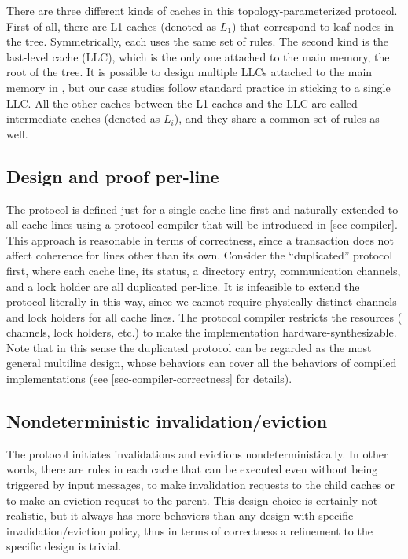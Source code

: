 There are three different kinds of caches in this topology-parameterized protocol.
First of all, there are L1 caches (denoted as $L_1$) that correspond to leaf nodes in the tree.
Symmetrically, each uses the same set of rules.
The second kind is the last-level cache (LLC), which is the only one attached to the main memory, the root of the tree.
It is possible to design multiple LLCs attached to the main memory in \hemiola{}, but our case studies follow standard practice in sticking to a single LLC.
All the other caches between the L1 caches and the LLC are called intermediate caches (denoted as $L_i$), and they share a common set of rules as well.

\subsection{Design and proof per-line}
\label{sec-design-line}

The protocol is defined just for a single cache line first and naturally extended to all cache lines using a protocol compiler that will be introduced in \autoref{sec-compiler}.
This approach is reasonable in terms of correctness, since a transaction does not affect coherence for lines other than its own.
Consider the ``duplicated'' protocol first, where each cache line, its status, a directory entry, communication channels, and a lock holder are all duplicated per-line.
It is infeasible to extend the protocol literally in this way, since we cannot require physically distinct channels and lock holders for all cache lines.
The protocol compiler restricts the resources (\eg{} channels, lock holders, etc.) to make the implementation hardware-synthesizable.
Note that in this sense the duplicated protocol can be regarded as the most general multiline design, whose behaviors can cover all the behaviors of compiled implementations (see \autoref{sec-compiler-correctness} for details).

\subsection{Nondeterministic invalidation/eviction}
\label{sec-nondet-inv-ev}

The protocol initiates invalidations and evictions nondeterministically.
In other words, there are rules in each cache that can be executed even without being triggered by input messages, to make invalidation requests to the child caches or to make an eviction request to the parent.
This design choice is certainly not realistic, but it always has more behaviors than any design with specific invalidation/eviction policy, thus in terms of correctness a refinement to the specific design is trivial.

